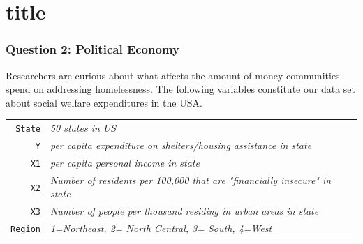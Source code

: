 \documentclass[12pt,letterpaper]{article}
\begin{document}
\part{title}	\section*{Question 2: Political Economy}

\noindent Researchers are curious about what affects the amount of money communities spend on addressing homelessness. The following variables constitute our data set about social welfare expenditures in the USA. \\
\vspace{.5cm}


\begin{tabular}{r|l}
	\texttt{State} &\emph{50 states in US} \\
	\texttt{Y} & \emph{per capita expenditure on shelters/housing assistance in state}\\
	\texttt{X1} &\emph{per capita personal income in state} \\
	\texttt{X2} &  \emph{Number of residents per 100,000 that are "financially insecure" in state}\\
	\texttt{X3} &  \emph{Number of people per thousand residing in urban areas in state} \\
	\texttt{Region} &  \emph{1=Northeast, 2= North Central, 3= South, 4=West} \\
\end{tabular}
\end{document}
